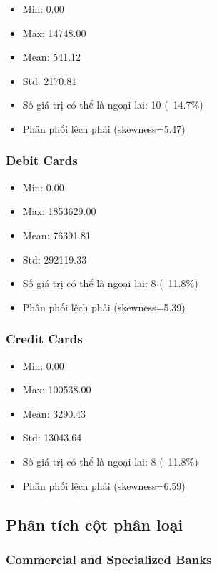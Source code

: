 \documentclass[12pt]{article}
\begin{document}
\begin{itemize}
    \item Min: 0.00
    \item Max: 14748.00
    \item Mean: 541.12
    \item Std: 2170.81
    \item Số giá trị có thể là ngoại lai: 10 (~14.7\%)
    \item Phân phối lệch phải (skewness=5.47)
\end{itemize}

\subsubsection{Debit Cards}

\begin{itemize}
    \item Min: 0.00
    \item Max: 1853629.00
    \item Mean: 76391.81
    \item Std: 292119.33
    \item Số giá trị có thể là ngoại lai: 8 (~11.8\%)
    \item Phân phối lệch phải (skewness=5.39)
\end{itemize}

\subsubsection{Credit Cards}

\begin{itemize}
    \item Min: 0.00
    \item Max: 100538.00
    \item Mean: 3290.43
    \item Std: 13043.64
    \item Số giá trị có thể là ngoại lai: 8 (~11.8\%)
    \item Phân phối lệch phải (skewness=6.59)
\end{itemize}

\subsection{Phân tích cột phân loại}

\subsubsection{Commercial and Specialized Banks}
\end{document}
